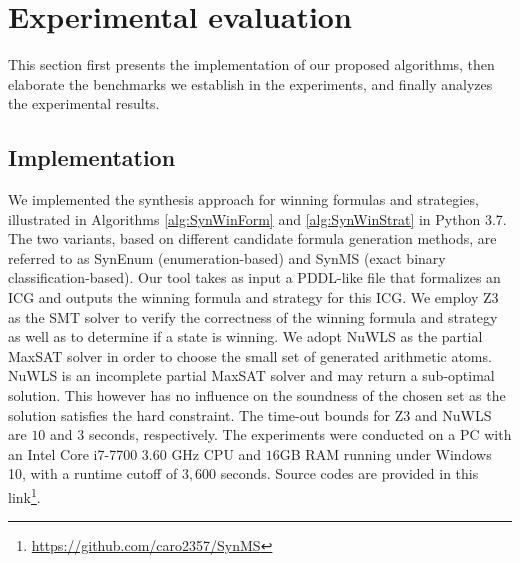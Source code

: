 \documentclass[review]{elsarticle}
\begin{document}
	
\section{Experimental evaluation}
This section first presents the implementation of our proposed algorithms, then elaborate the benchmarks we establish in the experiments, and finally analyzes the experimental results. 


\subsection{Implementation}
We implemented the synthesis approach for winning formulas and strategies, illustrated in Algorithms \ref{alg:SynWinForm} and \ref{alg:SynWinStrat} in Python 3.7.
The two variants, based on different candidate formula generation methods, are referred to as SynEnum (enumeration-based) and SynMS (exact binary classification-based).
Our tool takes as input a PDDL-like file that formalizes an ICG and outputs the winning formula and strategy for this ICG.
We employ Z3 \cite{MouB2008} as the SMT solver to verify the correctness of the winning formula and strategy as well as to determine if a state is winning.
We adopt NuWLS \cite{ChuCL2023} as the partial MaxSAT solver in order to choose the small set of generated arithmetic atoms.
NuWLS is an incomplete partial MaxSAT solver and may return a sub-optimal solution.
This however has no influence on the soundness of the chosen set as the solution satisfies the hard constraint.
The time-out bounds for Z3 and NuWLS are $10$ and $3$ seconds, respectively.
The experiments were conducted on a PC with an Intel Core i7-7700 $3.60$ GHz CPU and $16$GB RAM running under Windows 10, with a runtime cutoff of $3,600$ seconds.
Source codes are provided in this link\footnote{\url{https://github.com/caro2357/SynMS}}.
\end{document}
